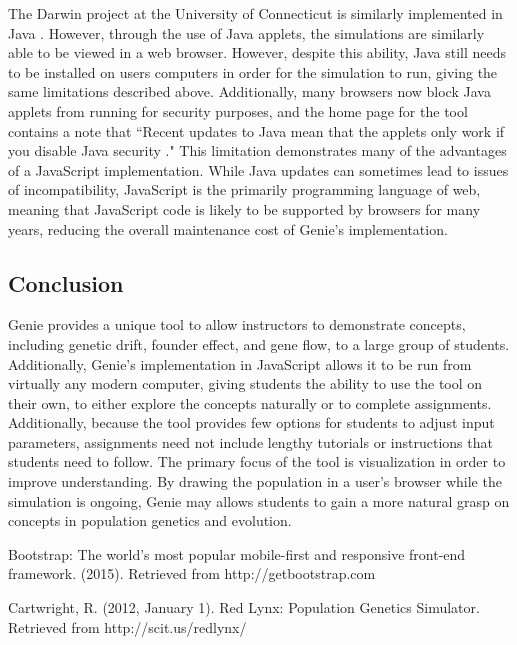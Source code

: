\documentclass[12pt]{article}
\begin{document}
\begin{spacing}{1.5}
\newline
The Darwin project at the University of Connecticut is similarly implemented in Java \cite{uconn}. However, through the use of Java applets, the simulations are similarly able to be viewed in a web browser. However, despite this ability, Java still needs to be installed on users computers in order for the simulation to run, giving the same limitations described above. Additionally, many browsers now block Java applets from running for security purposes, and the home page for the tool contains a note that ``Recent updates to Java mean that the applets only work if you disable Java security \cite{uconn}." This limitation demonstrates many of the advantages of a JavaScript implementation. While Java updates can sometimes lead to issues of incompatibility, JavaScript is the primarily programming language of web, meaning that JavaScript code is likely to be supported by browsers for many years, reducing the overall maintenance cost of Genie's implementation.

\subsection{Conclusion}
Genie provides a unique tool to allow instructors to demonstrate concepts, including genetic drift, founder effect, and gene flow, to a large group of students. Additionally, Genie's implementation in JavaScript allows it to be run from virtually any modern computer, giving students the ability to use the tool on their own, to either explore the concepts naturally or to complete assignments. Additionally, because the tool provides few options for students to adjust input parameters, assignments need not include lengthy tutorials or instructions that students need to follow. The primary focus of the tool is visualization in order to improve understanding. By drawing the population in a user's browser while the simulation is ongoing, Genie may allows students to gain a more natural grasp on concepts in population genetics and evolution.

\begin{thebibliography}{9}

Bootstrap: The world's most popular mobile-first and responsive front-end framework. (2015). Retrieved from http://getbootstrap.com

Cartwright, R. (2012, January 1). Red Lynx: Population Genetics Simulator. Retrieved from http://scit.us/redlynx/


\end{thebibliography}
\end{spacing}
\end{document}
